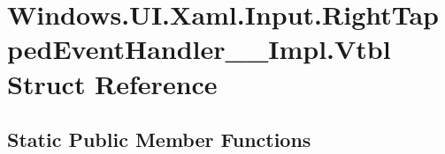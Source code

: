 \hypertarget{struct_windows_1_1_u_i_1_1_xaml_1_1_input_1_1_right_tapped_event_handler_____impl_1_1_vtbl}{}\section{Windows.\+U\+I.\+Xaml.\+Input.\+Right\+Tapped\+Event\+Handler\+\_\+\+\_\+\+Impl.\+Vtbl Struct Reference}
\label{struct_windows_1_1_u_i_1_1_xaml_1_1_input_1_1_right_tapped_event_handler_____impl_1_1_vtbl}
\subsection*{Static Public Member Functions}
